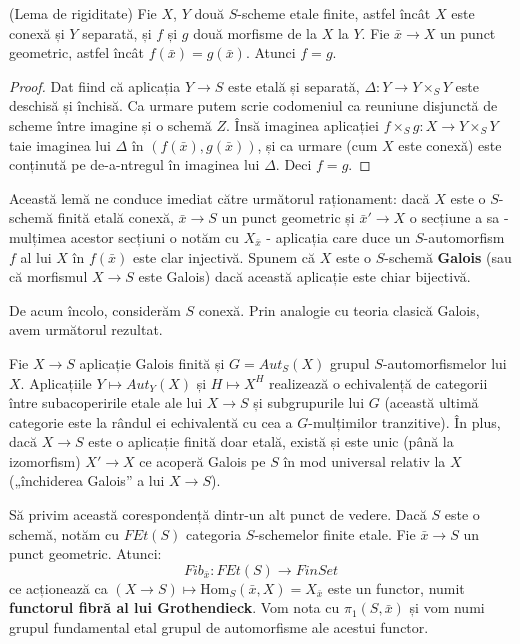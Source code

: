 \documentclass[13pt,openany,oneside]{book}
\begin{document}
\begin{lema}
(Lema de rigiditate) Fie $X$, $Y$ două $S$-scheme etale finite, astfel încât $X$ este conexă și $Y$ separată, și $f$ și $g$ două morfisme de la $X$ la $Y$. Fie $\bar{x} \rightarrow X$ un punct geometric, astfel încât $f(\bar{x})=g(\bar{x})$. Atunci $f=g$.
\end{lema}

\begin{proof}
Dat fiind că aplicația $Y \rightarrow S$ este etală și separată, $\Delta : Y \rightarrow Y \times_S Y$ este deschisă și închisă. Ca urmare putem scrie codomeniul ca reuniune disjunctă de scheme între imagine și o schemă $Z$. Însă imaginea aplicației $f \times_S g: X \rightarrow Y \times_S Y$ taie imaginea lui $\Delta$ în $(f(\bar{x}),g(\bar{x}))$, și ca urmare (cum $X$ este conexă) este conținută pe de-a-ntregul în imaginea lui $\Delta$. Deci $f=g$.
\end{proof}

Această lemă ne conduce imediat către următorul raționament: dacă $X$ este o $S$-schemă finită etală conexă, $\bar{x} \rightarrow S$ un punct geometric și $\bar{x}'\rightarrow X$ o secțiune a sa - mulțimea acestor secțiuni o notăm cu $X_{\bar{x}}$ - aplicația care duce un $S$-automorfism $f$ al lui $X$ în $f(\bar{x})$ este clar injectivă. Spunem că $X$ este o $S$-schemă {\bf Galois} (sau că morfismul $X \rightarrow S$ este Galois) dacă această aplicație este chiar bijectivă.

De acum încolo, considerăm $S$ conexă. Prin analogie cu teoria clasică Galois, avem următorul rezultat.

\begin{prop}
Fie $X \rightarrow S$ aplicație Galois finită și $G=Aut_S(X)$ grupul $S$-automorfismelor lui $X$. Aplicațiile $Y \mapsto Aut_Y(X)$ și $H \mapsto X^H$ realizează o echivalență de categorii între subacoperirile etale ale lui $X \rightarrow S$ și subgrupurile lui $G$ (această ultimă categorie este la rândul ei echivalentă cu cea a $G$-mulțimilor tranzitive). În plus, dacă $X \rightarrow S$ este o aplicație finită doar etală, există și este unic (până la izomorfism) $X' \rightarrow X$ ce acoperă Galois pe $S$ în mod universal relativ la $X$ („închiderea Galois” a lui $X \rightarrow S$).
\end{prop}

Să privim această corespondență dintr-un alt punct de vedere. Dacă $S$ este o schemă, notăm cu $FEt(S)$ categoria $S$-schemelor finite etale. Fie $\bar{x} \rightarrow S$ un punct geometric. Atunci:
$$Fib_{\bar{x}} : FEt(S) \rightarrow FinSet$$
ce acționează ca $(X \rightarrow S) \mapsto \text{Hom}_S(\bar{x},X)=X_{\bar{x}}$ este un functor, numit {\bf functorul fibră al lui Grothendieck}. Vom nota cu $\pi_1(S,\bar{x})$ și vom numi grupul fundamental etal grupul de automorfisme ale acestui functor.
\end{document}
